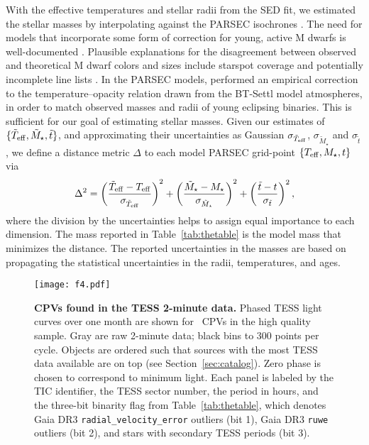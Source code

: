 \documentclass[11pt,twocolumn,tighten]{aastex63}
\begin{document}
With the effective temperatures and stellar radii from the SED fit, we
estimated the stellar masses by interpolating against the PARSEC
isochrones \citep[v1.2S][]{2014MNRAS.444.2525C}.  The need for models
that incorporate some form of correction for young, active M dwarfs is
well-documented
\citep[e.g.][]{2012ApJ...756...47S,2015ApJ...804..146D,2016A&A...593A..99F,2020ApJ...891...29S}.
Plausible explanations for the disagreement between observed and
theoretical M dwarf colors and sizes include starspot coverage
\citep[e.g.][]{2017ApJ...836..200G} and potentially incomplete line
lists \citep[e.g.][]{2013A&A...556A..15R}.  In the PARSEC models,
\citet{2014MNRAS.444.2525C} performed an empirical correction to the
temperature--opacity relation drawn from the BT-Settl model
atmospheres, in order to match observed masses and radii of young
eclipsing binaries.  This is sufficient for our goal of estimating
stellar masses.  Given our estimates of $\{ \tilde{T}_{\rm eff},
\tilde{M}_\star, \tilde{t} \}$, and approximating their uncertainties
as Gaussian $\sigma_{\tilde{T}_{\rm eff}}$, $\sigma_{\tilde{M}_\star}$
and $\sigma_{\tilde{t}}$, we define a distance metric $\Delta$ to each
model PARSEC grid-point $\{ T_{\rm eff}, M_\star, t \}$ via
\begin{equation}
  \Delta^2 = 
  \left( \frac{\tilde{T}_{\rm eff} - T_{\rm eff}}{\sigma_{\tilde{T}_{\rm eff}}} \right)^2
  +
  \left( \frac{\tilde{M}_{\star} - M_{\star}}{\sigma_{\tilde{M}_{\star}}} \right)^2
  +
  \left( \frac{\tilde{t} - t}{\sigma_{\tilde{t}}} \right)^2,
\end{equation}
where the division by the uncertainties helps to assign equal
importance to each dimension.  The mass reported in
Table~\ref{tab:thetable} is the model mass that minimizes the
distance.  The reported uncertainties in the masses are based on
propagating the statistical uncertainties in the radii, temperatures,
and ages.


\begin{figure*}[!tp]
	\begin{center}
		\centering
		\texttt{[image: f4.pdf]}
    \vspace{-0.3cm}
		\caption{
      {\bf CPVs found in the TESS 2-minute data.}
      Phased TESS light curves over one month are shown for \ngoods\
      CPVs in the high quality sample.  Gray are raw 2-minute data;
      black bins to 300 points per cycle.  Objects are ordered such
      that sources with the most TESS data available are on top (see
      Section~\ref{sec:catalog}).  Zero phase is chosen to correspond
      to minimum light.  Each panel is labeled by the TIC identifier,
      the TESS sector number, the period in hours, and the three-bit
      binarity flag from Table~\ref{tab:thetable}, which denotes Gaia
      DR3 \texttt{radial\_velocity\_error} outliers (bit 1), Gaia DR3
      \texttt{ruwe} outliers (bit 2), and stars with secondary TESS
      periods (bit 3). 
		}
		\label{fig:cqvs}
	\end{center}
\end{figure*}
\end{document}
